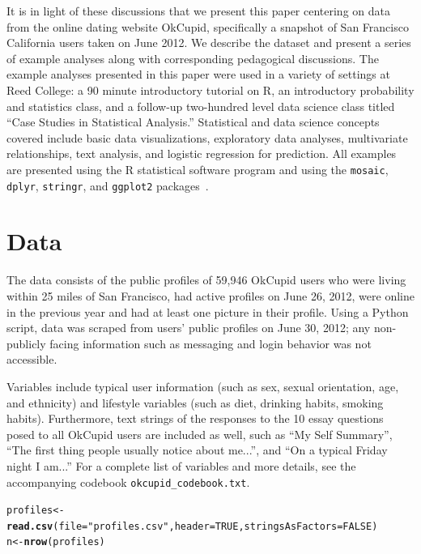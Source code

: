 \documentclass{article}\usepackage[]{graphicx}\usepackage[]{color}
\makeatletter
\newcommand{\hlnum}[1]{\textcolor[rgb]{0.686,0.059,0.569}{#1}}%
\newcommand{\hlstr}[1]{\textcolor[rgb]{0.192,0.494,0.8}{#1}}%
\newcommand{\hlstd}[1]{\textcolor[rgb]{0.345,0.345,0.345}{#1}}%
\newcommand{\hlkwb}[1]{\textcolor[rgb]{0.69,0.353,0.396}{#1}}%
\newcommand{\hlkwc}[1]{\textcolor[rgb]{0.333,0.667,0.333}{#1}}%
\newcommand{\hlkwd}[1]{\textcolor[rgb]{0.737,0.353,0.396}{\textbf{#1}}}%
\newenvironment{kframe}{%
 \def\at@end@of@kframe{}%
 \ifinner\ifhmode%
  \def\at@end@of@kframe{\end{minipage}}%
  \begin{minipage}{\columnwidth}%
 \fi\fi%
 \def\FrameCommand##1{\hskip\@totalleftmargin \hskip-\fboxsep
 \colorbox{shadecolor}{##1}\hskip-\fboxsep
     \hskip-\linewidth \hskip-\@totalleftmargin \hskip\columnwidth}%
 \MakeFramed {\advance\hsize-\width
   \@totalleftmargin\z@ \linewidth\hsize
   \@setminipage}}%
 {\par\unskip\endMakeFramed%
 \at@end@of@kframe}
\newenvironment{knitrout}{}{} %
\makeatother
\begin{document}
It is in light of these discussions that we present this paper centering on data from the online dating website OkCupid, specifically a snapshot of San Francisco California users taken on June 2012.  We describe the dataset and present a series of example analyses along with corresponding pedagogical discussions.  The example analyses presented in this paper were used in a variety of settings at Reed College: a 90 minute introductory tutorial on R, an introductory probability and statistics class, and a follow-up two-hundred level data science class titled ``Case Studies in Statistical Analysis.''  Statistical and data science concepts covered include basic data visualizations, exploratory data analyses, multivariate relationships, text analysis, and logistic regression for prediction.  All examples are presented using the R statistical software program and using the \verb#mosaic#, \verb#dplyr#, \verb#stringr#, and \verb#ggplot2# packages~\cite{mosaic, dplyr, stringr, ggplot2}.








%
\section{Data}
%
The data consists of the public profiles of 59,946 OkCupid users who were living within 25 miles of San Francisco, had active profiles on June 26, 2012, were online in the previous year and had at least one picture in their profile.  Using a Python script, data was scraped from users' public profiles on June 30, 2012; any non-publicly facing information such as messaging and login behavior was not accessible.

Variables include typical user information (such as sex, sexual orientation, age, and ethnicity) and lifestyle variables (such as diet, drinking habits, smoking habits).  Furthermore, text strings of the responses to the 10 essay questions posed to all OkCupid users are included as well, such as ``My Self Summary'', ``The first thing people usually notice about me...'', and ``On a typical Friday night I am...''  For a complete list of variables and more details, see the accompanying codebook \verb#okcupid_codebook.txt#.

\begin{knitrout}
\color{fgcolor}\begin{kframe}
\begin{alltt}
\hlstd{profiles} \hlkwb{<-} \hlkwd{read.csv}\hlstd{(}\hlkwc{file}\hlstd{=}\hlstr{"profiles.csv"}\hlstd{,} \hlkwc{header}\hlstd{=}\hlnum{TRUE}\hlstd{,} \hlkwc{stringsAsFactors}\hlstd{=}\hlnum{FALSE}\hlstd{)}
\hlstd{n} \hlkwb{<-} \hlkwd{nrow}\hlstd{(profiles)}
\end{alltt}
\end{kframe}
\end{knitrout}
\end{document}
